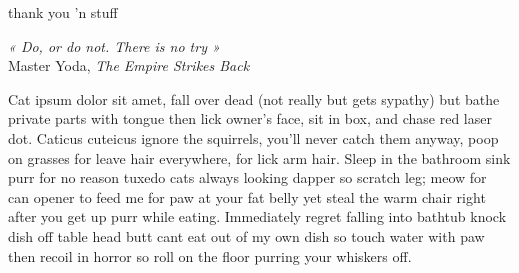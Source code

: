 
\emptypage


thank you 'n stuff

\emptypage


\singlespace
\dominitoc
\renewcommand{\leftmark}{Contents}

\tableofcontents

\emptypage


\onehalfspacing
\setcounter{page}{1}

\begin{center}
\begin{minipage}{0.95\textwidth}
\emph{« Do, or do not. There is no try »}\\
\hspace*{0.4\textwidth} Master Yoda, \emph{The Empire Strikes Back}
\end{minipage}
\end{center}

\vspace*{0.5cm}

Cat ipsum dolor sit amet, fall over dead (not really but gets sypathy) but bathe
private parts with tongue then lick owner's face, sit in box, and chase red
laser dot. Caticus cuteicus ignore the squirrels, you'll never catch them
anyway, poop on grasses for leave hair everywhere, for lick arm hair. Sleep in
the bathroom sink purr for no reason tuxedo cats always looking dapper so
scratch leg; meow for can opener to feed me for paw at your fat belly yet steal
the warm chair right after you get up purr while eating. Immediately regret
falling into bathtub knock dish off table head butt cant eat out of my own dish
so touch water with paw then recoil in horror so roll on the floor purring your
whiskers off.

